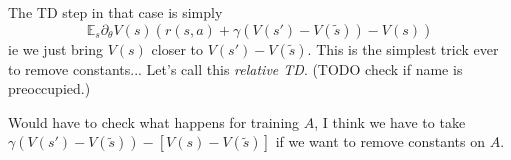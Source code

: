 \documentclass[11pt]{article}
\newcommand{\E}{\mathbb{E}}
\begin{document}
The TD step in that case is simply
\begin{equation}
\E_s \partial_\theta V(s) \left(
r(s,a)+\gamma(V(s')-V(\tilde s))-V(s)\right)
\end{equation}
ie we just bring $V(s)$ closer to $V(s')-V(\tilde s)$. This is the
simplest trick ever to remove constants... Let's call this \emph{relative
TD}. (TODO check if name is preoccupied.)

Would have to check what happens for training $A$, I think we have to
take $\gamma(V(s')-V(\tilde s))-[V(s)-V(\tilde s)]$ if we want to remove
constants on $A$.
\end{document}

